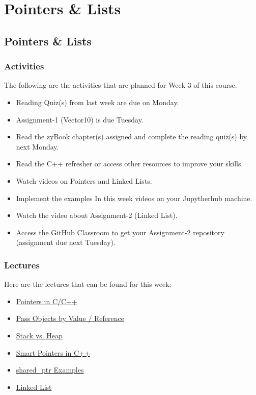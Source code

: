 \clearpage

\renewcommand{\ChapTitle}{Pointers \& Lists}

\chapter{\ChapTitle}
\section{\ChapTitle}

\subsection{Activities}

The following are the activities that are planned for Week 3 of this course.

\begin{itemize}
    \item Reading Quiz(s) from last week are due on Monday.
    \item Assignment-1 (Vector10) is due Tuesday.
    \item Read the zyBook chapter(s) assigned and complete the reading quiz(s) by next Monday.
    \item Read the C++ refresher or access other resources to improve your skills.
    \item Watch videos on Pointers and Linked Lists.
    \item Implement the examples In this week videos on your Jupytherhub machine.
    \item Watch the video about Assignment-2 (Linked List).
    \item Access the GitHub Classroom to get your Assignment-2 repository  (assignment due next Tuesday).
\end{itemize}

\subsection{Lectures}

Here are the lectures that can be found for this week:

\begin{itemize}
    \item \href{https://www.youtube.com/watch?v=PLQK95HoMR8}{Pointers in C/C++}
    \item \href{https://www.youtube.com/watch?v=r1gCuzMQWP8}{Pass Objects by Value / Reference}
    \item \href{https://www.youtube.com/watch?v=HeJEOz7CFUU}{Stack vs. Heap}
    \item \href{https://www.youtube.com/watch?v=lnFReYlnNYw}{Smart Pointers in C++}
    \item \href{https://www.youtube.com/watch?v=4lyTPdZwp0w}{shared\_ptr Examples}
    \item \href{https://www.youtube.com/watch?v=8uPA8BpaRu4}{Linked List}
\end{itemize}

